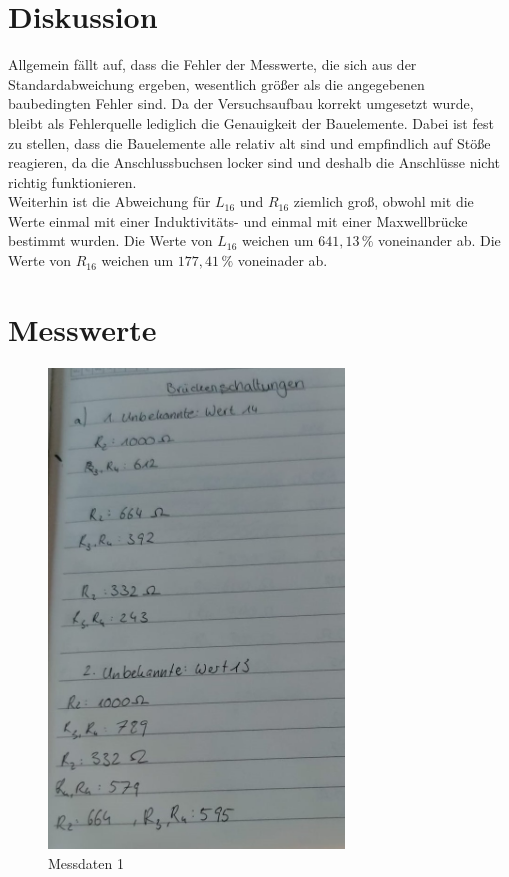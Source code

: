 \section{Diskussion}
\label{sec:Diskussion}
Allgemein fällt auf, dass die Fehler der Messwerte, die sich aus der Standardabweichung ergeben, wesentlich größer
als die angegebenen baubedingten Fehler sind. Da der Versuchsaufbau korrekt umgesetzt wurde, bleibt als Fehlerquelle
lediglich die Genauigkeit der Bauelemente. Dabei ist fest zu stellen, dass die Bauelemente alle relativ alt sind und
empfindlich auf Stöße reagieren, da die Anschlussbuchsen locker sind und deshalb die Anschlüsse nicht richtig
funktionieren.\\
Weiterhin ist die Abweichung für $L_{16}$ und $R_{16}$ ziemlich groß, obwohl mit die Werte einmal mit einer 
Induktivitäts- und einmal mit einer Maxwellbrücke bestimmt wurden. Die Werte von $L_{16}$ weichen um $641,13\,\%$
voneinander ab. Die Werte von $R_{16}$ weichen um $177,41\,\%$ voneinader ab.\\


\section{Messwerte}
\label{sec:Messwerte}

\begin{figure}
  \centering
  \includegraphics[width=0.7\textwidth]{M_a).jpeg}
  \caption{Messdaten 1}
  \label{fig:M1}
\end{figure}

